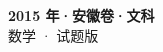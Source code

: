 \documentclass[zihao=-4, a4paper]{ctexart}
\begin{document}
\begin{center}
  {\Large\bfseries 2015 年·安徽卷·文科}\\[4pt]
  {\large 数学 · 试题版}
\end{center}
\medskip
{}

\end{document}
